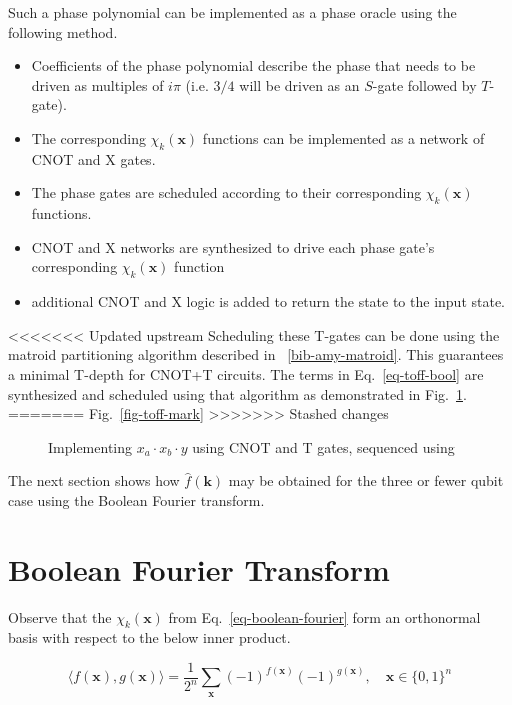 Such a phase polynomial can be implemented as a phase oracle using the following
method.

\begin{itemize}
\item Coefficients of the phase polynomial describe the phase that needs to be driven
  as multiples of $i\pi$ (i.e. $3/4$ will be driven as an $S$-gate followed by $T$-gate).
\item The corresponding $\chi_k(\mathbf{x})$ functions can be implemented as a network
  of CNOT and X gates.
\item The phase gates are scheduled according to their corresponding $\chi_k(\mathbf{x})$
  functions.
\item CNOT and X networks are synthesized to drive each phase gate's corresponding
  $\chi_k(\mathbf{x})$ function
\item additional CNOT and X logic is added to return the state to the input state.
\end{itemize}

<<<<<<< Updated upstream
Scheduling these T-gates can be done using the matroid partitioning algorithm described in
~\ref{bib-amy-matroid}. This guarantees a minimal T-depth for CNOT+T circuits.
The terms in Eq.~\ref{eq-toff-bool} are synthesized and scheduled using that algorithm as
demonstrated in Fig.~\ref{fig-toff-mark-matroid}.
=======
Fig.~\ref{fig-toff-mark}
>>>>>>> Stashed changes
\begin{figure}[t]
  \centering
  \scalebox{0.7} {
    
  }
  \caption{Implementing $x_a \cdot x_b \cdot y$ using CNOT and T gates, sequenced using~\cite{bib-amy-matroid}}
  \label{fig-toff-mark-matroid}
\end{figure}

The next section shows how $\hat{f}(\mathbf{k})$ may be obtained for the three or fewer qubit case using the
Boolean Fourier transform.

\section{Boolean Fourier Transform}

Observe that the $\chi_k(\mathbf{x})$ from Eq.~\ref{eq-boolean-fourier} form an orthonormal basis with respect
to the below inner product.

\begin{equation}
  \label{eq-inner-prod}
  \langle f(\mathbf{x}) , g(\mathbf{x}) \rangle = \frac{1}{2^n} \sum_{\mathbf{x}} (-1)^{f(\mathbf{x})} (-1)^{g(\mathbf{x})}, \quad \mathbf{x} \in \{0,1\}^n
\end{equation}

